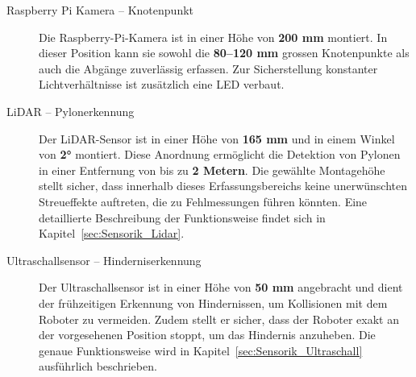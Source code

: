 \documentclass[main.tex]{subfiles} %
\begin{document}
\begin{description}
    \item[Raspberry Pi Kamera – Knotenpunkt] Die Raspberry-Pi-Kamera ist in einer Höhe von \textbf{200 mm} montiert. In dieser Position kann 
        sie sowohl die \textbf{80–120 mm} grossen Knotenpunkte als auch die Abgänge zuverlässig erfassen. 
        Zur Sicherstellung konstanter Lichtverhältnisse ist zusätzlich eine LED verbaut.
    
    \item[LiDAR – Pylonerkennung] Der LiDAR-Sensor ist in einer Höhe von \textbf{165 mm} und in einem Winkel von \textbf{2°} montiert. 
        Diese Anordnung ermöglicht die Detektion von Pylonen in einer Entfernung von bis zu \textbf{2 Metern}. 
        Die gewählte Montagehöhe stellt sicher, dass innerhalb dieses Erfassungsbereichs keine unerwünschten 
        Streueffekte auftreten, die zu Fehlmessungen führen könnten. Eine detaillierte Beschreibung der 
        Funktionsweise findet sich in Kapitel~\ref{sec:Sensorik_Lidar}.
    
    \item[Ultraschallsensor – Hinderniserkennung] Der Ultraschallsensor ist in einer Höhe von \textbf{50 mm} angebracht und dient der frühzeitigen 
        Erkennung von Hindernissen, um Kollisionen mit dem Roboter zu vermeiden. Zudem stellt er sicher, 
        dass der Roboter exakt an der vorgesehenen Position stoppt, um das Hindernis anzuheben. Die genaue 
        Funktionsweise wird in Kapitel~\ref{sec:Sensorik_Ultraschall} ausführlich beschrieben.

\end{description}
\end{document}
